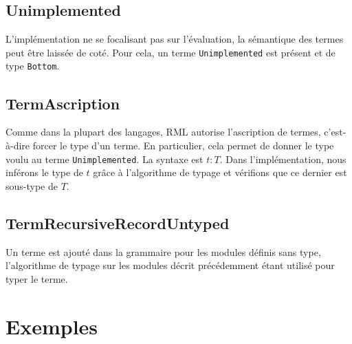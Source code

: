 \subsection*{Unimplemented}

L'implémentation ne se focalisant pas sur l'évaluation, la sémantique des termes
peut être laissée de coté. Pour cela, un terme \verb|Unimplemented| est présent
et de type \verb|Bottom|.

\subsection*{TermAscription}

Comme dans la plupart des langages, RML autorise l'ascription de termes,
c'est-à-dire forcer le type d'un terme. En particulier, cela permet de donner le
type voulu au terme \verb|Unimplemented|. La syntaxe est $t : T$. Dans
l'implémentation, nous inférons le type de $t$ grâce à l'algorithme de typage et
vérifions que ce dernier est sous-type de $T$.

\subsection*{TermRecursiveRecordUntyped}

Un terme est ajouté dans la grammaire pour les modules définis sans type,
l'algorithme de typage sur les modules décrit précédemment étant utilisé pour
typer le terme.


%
%
%

\section{Exemples}


